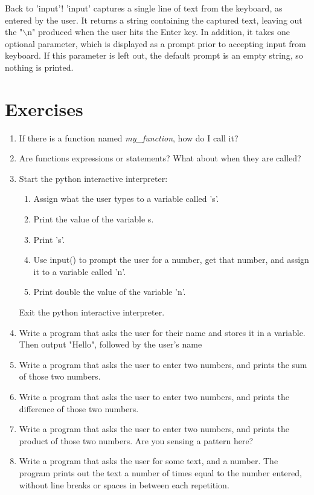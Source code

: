 Back to 'input'! 'input' captures a single line of text from     the keyboard, as entered by the user. It returns a string containing     the captured text, leaving out the "$\backslash$n" produced when the user hits the     Enter key. In addition, it takes one optional parameter, which is     displayed as a prompt prior to accepting input from keyboard. If this     parameter is left out, the default prompt is an empty string, so     nothing is printed.

\section{Exercises}
\begin{enumerate}
	\item If there is a function named \textit{my\_function}, how do I call       it?
	\item Are functions expressions or statements? What about when they       are called?
	\item Start the python interactive interpreter:        
\begin{enumerate}
	\item Assign what the user types to a variable called           's'.
	\item Print the value of the variable s.
	\item Print 's'.
	\item Use input() to prompt the user for a number, get that number, and assign it to a variable called 'n'.
	\item Print double the value of the variable 'n'.
\end{enumerate}        Exit the python interactive interpreter.      
	\item Write a program that asks the user for their name and       stores it in a variable. Then output "Hello", followed by the       user's name
	\item Write a program that asks the user to enter two numbers, and       prints the sum of those two numbers.
	\item Write a program that asks the user to enter two numbers, and       prints the difference of those two numbers.
	\item Write a program that asks the user to enter two numbers, and       prints the product of those two numbers. Are you sensing a pattern       here?
	\item Write a program that asks the user for some text, and a number.       The program prints out the text a number of times equal to the       number entered, without line breaks or spaces in between each       repetition.
\end{enumerate}   

